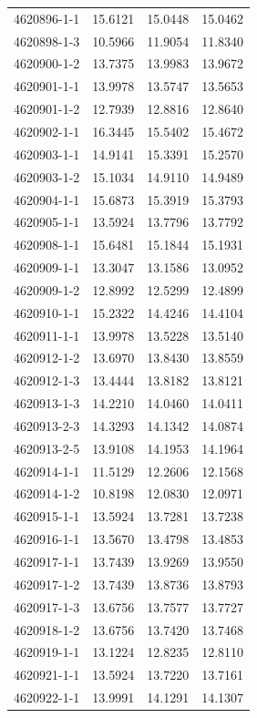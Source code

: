 \begin{longtable}{lrrr}
4620896-1-1 & 15.6121 & 15.0448 & 15.0462 \\
4620898-1-3 & 10.5966 & 11.9054 & 11.8340 \\
4620900-1-2 & 13.7375 & 13.9983 & 13.9672 \\
4620901-1-1 & 13.9978 & 13.5747 & 13.5653 \\
4620901-1-2 & 12.7939 & 12.8816 & 12.8640 \\
4620902-1-1 & 16.3445 & 15.5402 & 15.4672 \\
4620903-1-1 & 14.9141 & 15.3391 & 15.2570 \\
4620903-1-2 & 15.1034 & 14.9110 & 14.9489 \\
4620904-1-1 & 15.6873 & 15.3919 & 15.3793 \\
4620905-1-1 & 13.5924 & 13.7796 & 13.7792 \\
4620908-1-1 & 15.6481 & 15.1844 & 15.1931 \\
4620909-1-1 & 13.3047 & 13.1586 & 13.0952 \\
4620909-1-2 & 12.8992 & 12.5299 & 12.4899 \\
4620910-1-1 & 15.2322 & 14.4246 & 14.4104 \\
4620911-1-1 & 13.9978 & 13.5228 & 13.5140 \\
4620912-1-2 & 13.6970 & 13.8430 & 13.8559 \\
4620912-1-3 & 13.4444 & 13.8182 & 13.8121 \\
4620913-1-3 & 14.2210 & 14.0460 & 14.0411 \\
4620913-2-3 & 14.3293 & 14.1342 & 14.0874 \\
4620913-2-5 & 13.9108 & 14.1953 & 14.1964 \\
4620914-1-1 & 11.5129 & 12.2606 & 12.1568 \\
4620914-1-2 & 10.8198 & 12.0830 & 12.0971 \\
4620915-1-1 & 13.5924 & 13.7281 & 13.7238 \\
4620916-1-1 & 13.5670 & 13.4798 & 13.4853 \\
4620917-1-1 & 13.7439 & 13.9269 & 13.9550 \\
4620917-1-2 & 13.7439 & 13.8736 & 13.8793 \\
4620917-1-3 & 13.6756 & 13.7577 & 13.7727 \\
4620918-1-2 & 13.6756 & 13.7420 & 13.7468 \\
4620919-1-1 & 13.1224 & 12.8235 & 12.8110 \\
4620921-1-1 & 13.5924 & 13.7220 & 13.7161 \\
4620922-1-1 & 13.9991 & 14.1291 & 14.1307 \\

\end{longtable}
